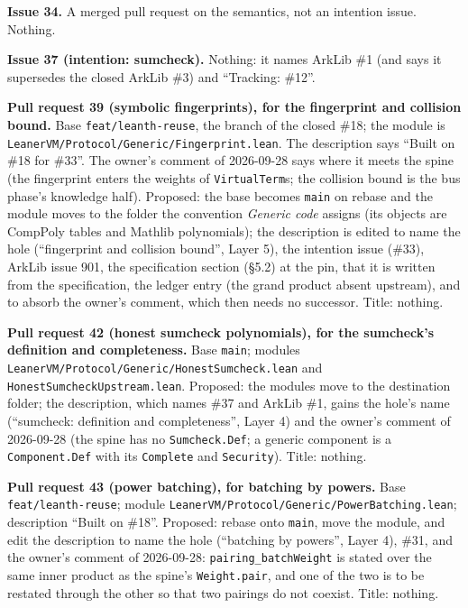 \textbf{Issue 34.} A merged pull request on the semantics, not an intention issue. Nothing.

\textbf{Issue 37 (intention: sumcheck).} Nothing: it names ArkLib \#1 (and says it supersedes the closed ArkLib \#3) and ``Tracking: \#12''.

\begin{sloppypar}
\textbf{Pull request 39 (symbolic fingerprints), for the fingerprint and collision bound.} Base \texttt{feat/\allowbreak{}leanth-\allowbreak{}reuse}, the branch of the closed \#18; the module is \texttt{Leaner\allowbreak{}VM/\allowbreak{}Protocol/\allowbreak{}Generic/\allowbreak{}Fingerprint.\allowbreak{}lean}. The description says ``Built on \#18 for \#33''. The owner's comment of 2026-09-28 says where it meets the spine (the fingerprint enters the weights of \texttt{VirtualTerm}s; the collision bound is the bus phase's knowledge half). Proposed: the base becomes \texttt{main} on rebase and the module moves to the folder the convention \emph{Generic code} assigns (its objects are CompPoly tables and Mathlib polynomials); the description is edited to name the hole (``fingerprint and collision bound'', Layer 5), the intention issue (\#33), ArkLib issue 901, the specification section (§5.2) at the pin, that it is written from the specification, the ledger entry (the grand product absent upstream), and to absorb the owner's comment, which then needs no successor. Title: nothing.
\end{sloppypar}

\begin{sloppypar}
\textbf{Pull request 42 (honest sumcheck polynomials), for the sumcheck's definition and completeness.} Base \texttt{main}; modules \texttt{Leaner\allowbreak{}VM/\allowbreak{}Protocol/\allowbreak{}Generic/\allowbreak{}Honest\allowbreak{}Sumcheck.\allowbreak{}lean} and \texttt{Honest\allowbreak{}Sumcheck\allowbreak{}Upstream.\allowbreak{}lean}. Proposed: the modules move to the destination folder; the description, which names \#37 and ArkLib \#1, gains the hole's name (``sumcheck: definition and completeness'', Layer 4) and the owner's comment of 2026-09-28 (the spine has no \texttt{Sumcheck.\allowbreak{}Def}; a generic component is a \texttt{Component.\allowbreak{}Def} with its \texttt{Complete} and \texttt{Security}). Title: nothing.
\end{sloppypar}

\begin{sloppypar}
\textbf{Pull request 43 (power batching), for batching by powers.} Base \texttt{feat/\allowbreak{}leanth-\allowbreak{}reuse}; module \texttt{Leaner\allowbreak{}VM/\allowbreak{}Protocol/\allowbreak{}Generic/\allowbreak{}Power\allowbreak{}Batching.\allowbreak{}lean}; description ``Built on \#18''. Proposed: rebase onto \texttt{main}, move the module, and edit the description to name the hole (``batching by powers'', Layer 4), \#31, and the owner's comment of 2026-09-28: \texttt{pairing\_\allowbreak{}batch\allowbreak{}Weight} is stated over the same inner product as the spine's \texttt{Weight.\allowbreak{}pair}, and one of the two is to be restated through the other so that two pairings do not coexist. Title: nothing.
\end{sloppypar}

